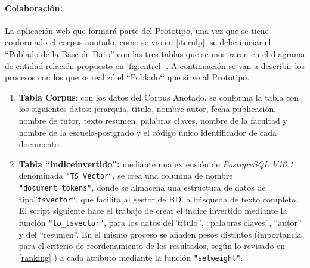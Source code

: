 \documentclass[
  12pt,
  openany]{book}
\begin{document}
\hypertarget{colaboraciuxf3n-6}{%
\paragraph{Colaboración:}\label{colaboraciuxf3n-6}}

La aplicación web que formará parte del Prototipo, una vez que se tiene conformado el corpus anotado, como se vio en \ref{iternlp}, se debe iniciar el ``Poblado de la Base de Dato'' con las tres tablas que se mostraron en el diagrama de entidad relación propuesto en \ref{fig:entrel} . A continuación se van a describir los procesos con los que se realizó el ``Poblado\textbf{``} que sirve al Prototipo.

\begin{enumerate}
\def\labelenumi{\arabic{enumi}.}
\item
  \textbf{Tabla Corpus}: con los datos del Corpus Anotado, se conforma la tabla con los siguientes datos: jerarquía, título, nombre autor, fecha publicación, nombre de tutor, texto resumen, palabras claves, nombre de la facultad y nombre de la escuela-postgrado y el código único identificador de cada documento.
\item
  \textbf{Tabla ``indiceinvertido'':} mediante una extensión de \emph{PostrgreSQL V16.1} denominada \texttt{"TS\_Vector}``, se crea una columna de nombre \texttt{"document\_tokens"}, donde se almacena una estructura de datos de tipo''\texttt{tsvector}``, que facilita al gestor de BD la búsqueda de texto completo. El script siguiente hace el trabajo de crear el índice invertido mediante la función \texttt{"to\_tsvector"}, para los datos del''título'', ``palabras claves'', ``autor'' y del ``resumen''. En el mismo proceso se añaden pesos distintos (importancia para el criterio de reordenamiento de los resultados, según lo revisado en \ref{ranking} ) a cada atributo mediante la función \texttt{"setweight"}.

  \newpage


\end{enumerate}
\end{document}
